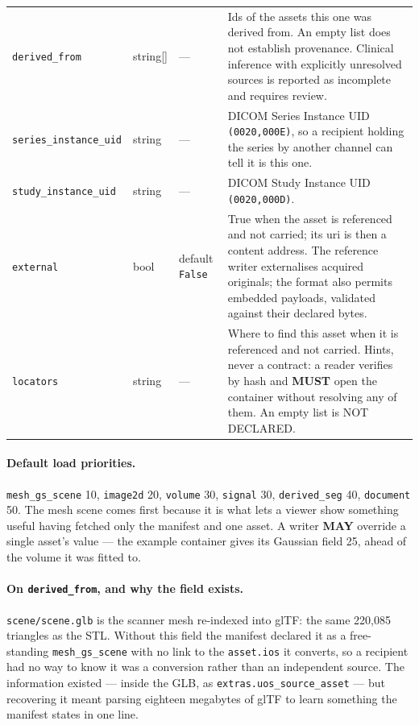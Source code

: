 \documentclass[11pt,a4paper]{article}
\newcommand{\MUST}{\textcolor{uosred}{\textbf{MUST}}}
\newcommand{\MAY}{\textcolor{uosgreen}{\textbf{MAY}}}
\newcommand{\code}[1]{\texttt{\small #1}}
\begin{document}
\begin{longtable}{L{3.2cm} L{2.9cm} C{1.4cm} L{6.8cm}}
\code{derived\_from} & string[] & --- & Ids of the assets this one was derived from. An empty list does not establish provenance. Clinical inference with explicitly unresolved sources is reported as incomplete and requires review.\\
\code{series\_instance\_uid} & string & --- & DICOM Series Instance UID \code{(0020,000E)}, so a recipient holding the series by another channel can tell it is this one.\\
\code{study\_instance\_uid} & string & --- & DICOM Study Instance UID \code{(0020,000D)}.\\
\code{external} & bool & default \code{False} & True when the asset is referenced and not carried; its uri is then a content address. The reference writer externalises acquired originals; the format also permits embedded payloads, validated against their declared bytes.\\
\code{locators} & string & --- & Where to find this asset when it is referenced and not carried. Hints, never a contract: a reader verifies by hash and \MUST{} open the container without resolving any of them. An empty list is NOT DECLARED.\\
\bottomrule
\end{longtable}

\paragraph{Default load priorities.} \code{mesh\_gs\_scene} 10, \code{image2d} 20,
\code{volume} 30, \code{signal} 30, \code{derived\_seg} 40, \code{document} 50. The mesh
scene comes first because it is what lets a viewer show something useful having fetched
only the manifest and one asset. A writer \MAY{} override a single asset's value --- the
example container gives its Gaussian field 25, ahead of the volume it was fitted to.

\paragraph{On \code{derived\_from}, and why the field exists.} \code{scene/scene.glb}
is the scanner mesh re-indexed into glTF: the same 220{,}085 triangles as the STL. Without
this field the manifest declared it as a free-standing \code{mesh\_gs\_scene} with no link
to the \code{asset.ios} it converts, so a recipient had no way to know it was a conversion
rather than an independent source. The information existed --- inside the GLB, as
\code{extras.uos\_source\_asset} --- but recovering it meant parsing eighteen megabytes of
glTF to learn something the manifest states in one line.
\end{document}
